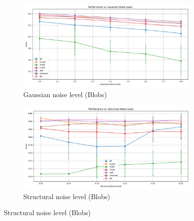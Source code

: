 \documentclass[
	10pt,
	parskip=half-,	
	paper=a4,
	english
	]{scrartcl}
\begin{document}
\begin{figure}[h!]
    \centering
    \begin{subfigure}[b]{0.45\textwidth}
        \includegraphics[width=\textwidth]{../data/plots/results_gaussian_noise_blobs.png}
        \caption{Gaussian noise level (Blobs)}
    \end{subfigure}
    \begin{subfigure}[b]{0.45\textwidth}
        \includegraphics[width=\textwidth]{../data/plots/results_structural_noise_blobs.png}
        \caption{Structural noise level (Blobs)}
    \end{subfigure}
    
    \vspace{0.3cm}
    

\end{figure}
\end{document}
